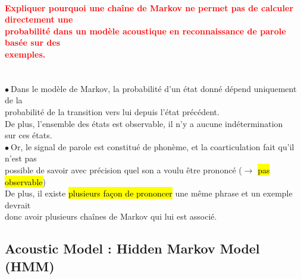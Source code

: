 \documentclass[letterpaper, 12pt]{article}
\newcommand{\alinea}{
\hspace*{0.3cm}}
\newcommand{\red}[1]{
	\textcolor{red}{#1}
}
\newcommand{\point}{$\bullet\ $}
\begin{document}
		\paragraph{\red{Expliquer pourquoi une chaîne de Markov ne permet pas de calculer directement une 
		~\\ \hspace*{0.035cm} probabilité dans un modèle acoustique en reconnaissance de parole basée sur des 
		~\\ \hspace*{0.035cm} exemples.}}~\\
			\point Dans le modèle de Markov, la probabilité d'un état donné dépend uniquement de la  
				\\\alinea probabilité de la transition vers lui depuis l'état précédent. 
				\\\alinea De plus, l'ensemble des états est observable, il n'y a aucune indétermination 
				\\\alinea sur ces états.\\
			\point Or, le signal de parole est constitué de phonème, et la coarticulation fait qu'il n'est pas
				\\\alinea possible de savoir avec précision quel son a voulu être prononcé ($\rightarrow$ \hl{pas 
				observable})\\\alinea De plus, il existe \hl{plusieurs fa\c con de prononcer} une même phrase et 
				un exemple devrait \\\alinea donc avoir plusieurs chaînes de Markov qui lui est associé.
		
	\subsection{Acoustic Model : Hidden Markov Model (HMM)}
\end{document}
